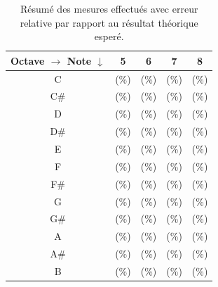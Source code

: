 \begin{table}[ht]
	\centering
		\begin{tabular}{|c|c|c|c|c|}
			\hline
				\specialcell{Octave $\rightarrow$ \\ Note $\downarrow$} & 5 & 6 & 7 & 8 \\
			\hline
				 C & \unit{}{\milli\volt} (\%) & \unit{}{\milli\volt} (\%) & \unit{}{\milli\volt} (\%) & \unit{}{\milli\volt} (\%) \\
			\hline
				 C\# & \unit{}{\milli\volt} (\%) & \unit{}{\milli\volt} (\%) & \unit{}{\milli\volt} (\%) & \unit{}{\milli\volt} (\%) \\
			\hline
				 D & \unit{}{\milli\volt} (\%) & \unit{}{\milli\volt} (\%) & \unit{}{\milli\volt} (\%) & \unit{}{\milli\volt} (\%) \\
			\hline
				 D\# & \unit{}{\milli\volt} (\%) & \unit{}{\milli\volt} (\%) & \unit{}{\milli\volt} (\%) & \unit{}{\milli\volt} (\%) \\
			\hline
				 E & \unit{}{\milli\volt} (\%) & \unit{}{\milli\volt} (\%) & \unit{}{\milli\volt} (\%) & \unit{}{\milli\volt} (\%) \\
			\hline
				 F & \unit{}{\milli\volt} (\%) & \unit{}{\milli\volt} (\%) & \unit{}{\milli\volt} (\%) & \unit{}{\milli\volt} (\%) \\
			\hline
				 F\# & \unit{}{\milli\volt} (\%) & \unit{}{\milli\volt} (\%) & \unit{}{\milli\volt} (\%) & \unit{}{\milli\volt} (\%) \\
			\hline
				 G & \unit{}{\milli\volt} (\%) & \unit{}{\milli\volt} (\%) & \unit{}{\milli\volt} (\%) & \unit{}{\milli\volt} (\%) \\
			\hline
				 G\# & \unit{}{\milli\volt} (\%) & \unit{}{\milli\volt} (\%) & \unit{}{\milli\volt} (\%) & \unit{}{\milli\volt} (\%) \\
			\hline
				 A & \unit{}{\milli\volt} (\%) & \unit{}{\milli\volt} (\%) & \unit{}{\milli\volt} (\%) & \unit{}{\milli\volt} (\%) \\
			\hline
				 A\# & \unit{}{\milli\volt} (\%) & \unit{}{\milli\volt} (\%) & \unit{}{\milli\volt} (\%) & \unit{}{\milli\volt} (\%) \\
			\hline
				 B & \unit{}{\milli\volt} (\%) & \unit{}{\milli\volt} (\%) & \unit{}{\milli\volt} (\%) & \unit{}{\milli\volt} (\%) \\
			\hline
		\end{tabular}
	\caption{Résumé des mesures effectués avec erreur relative par rapport au résultat
	théorique esperé.}
	\label{tab:keyboard-measure-vs-theroy}
\end{table}


